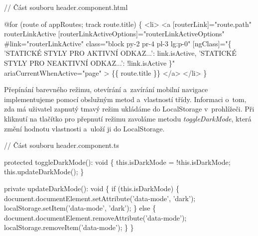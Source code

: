 \begin{prog}
// Část souboru header.component.html

@for (route of appRoutes; track route.title) \{
  <li>
    <a
      [routerLink]="route.path"
      routerLinkActive
      [routerLinkActiveOptions]="routerLinkActiveOptions"
      #link="routerLinkActive"
      class="block py-2 pr-4 pl-3 lg:p-0"
      [ngClass]="\{
        'STATICKÉ STYLY PRO AKTIVNÍ ODKAZ...': link.isActive,
        'STATICKÉ STYLY PRO NEAKTIVNÍ ODKAZ...': !link.isActive
      \}"
      ariaCurrentWhenActive="page"
    >
      \{\{ route.title \}\}
    </a>
  </li>
\}
\end{prog}

Přepínání barevného režimu, otevírání a~zavírání mobilní navigace implementujeme pomocí obslužným metod a~vlastností třídy. 
Informaci o~tom, zda má uživatel zapnutý tmavý režim ukládáme do LocalStorage v~prohlížeči. 
Při kliknutí na tlačítko pro přepnutí režimu zavoláme metodu \emph{toggleDarkMode}, která změní hodnotu vlastnosti a~uloží ji do LocalStorage.

\begin{prog}
// Část souboru header.component.ts

protected toggleDarkMode(): void \{
  this.isDarkMode = !this.isDarkMode;
  this.updateDarkMode();
\}

private updateDarkMode(): void \{
  if (this.isDarkMode) \{
    document.documentElement.setAttribute('data-mode', 'dark');
    localStorage.setItem('data-mode', 'dark');
  \} else \{
    document.documentElement.removeAttribute('data-mode');
    localStorage.removeItem('data-mode');
  \}
\}
\end{prog}